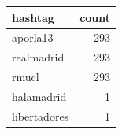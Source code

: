 \begin{tabular}{lr}
\toprule
hashtag & count \\
\midrule
aporla13 & 293 \\
realmadrid & 293 \\
rmucl & 293 \\
halamadrid & 1 \\
libertadores & 1 \\
\bottomrule
\end{tabular}
